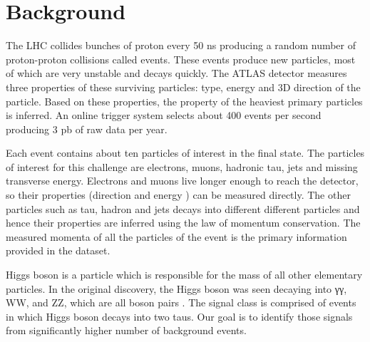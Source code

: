 \section{Background}
\label{sec:background}

The LHC collides bunches of proton every 50 ns producing a random number of proton-proton collisions called events. These events produce new particles, most of which are very unstable and decays quickly. The ATLAS detector measures three properties of these surviving particles: type, energy and 3D direction of the particle. Based on these properties,  the property of the heaviest primary particles is inferred. An online trigger system selects about 400 events per second producing 3 pb of raw data per year.

Each event contains about ten particles of interest in the final state. The particles of interest for this challenge are electrons, muons, hadronic tau, jets and missing transverse energy. Electrons and muons live longer enough to reach the detector, so their properties (direction and energy ) can be measured directly. The other particles such as tau, hadron and jets decays into different different particles and hence their properties are inferred using the law of momentum conservation.  The measured momenta of all the particles of the event is the primary information provided in the dataset. 

Higgs boson is a particle which is responsible for the mass of all other elementary particles. In the original discovery, the Higgs boson was seen decaying into γγ, WW, and ZZ, which are all boson pairs . The signal class is comprised of events in which Higgs boson decays into two taus. Our goal is to identify those signals from significantly higher number of background events.
